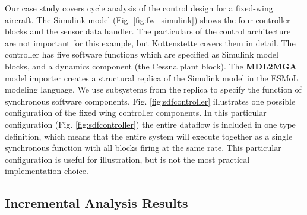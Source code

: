 Our case study covers cycle analysis of the control design for a fixed-wing 
aircraft.  The Simulink model (Fig. \ref{fig:fw_simulink}) shows the four controller blocks and the sensor data handler.  The particulars of the control architecture are not important for this example, but Kottenstette covers them in detail\cite{control:fixed_wing}.   The controller has five software functions which are specified as Simulink model blocks, and a dynamics component (the Cessna plant block).  The 
\textbf{MDL2MGA} model importer creates a structural replica of the Simulink
model in the ESMoL modeling language.  We use subsystems from the replica
to specify the function of synchronous software components.  
Fig. \ref{fig:sdfcontroller} illustrates one possible configuration of the fixed wing controller components.  
In this particular configuration 
(Fig. \ref{fig:sdfcontroller}) the entire dataflow is included in one
type definition, which means that the entire system will execute together
as a single synchronous function with all blocks firing at the same rate.
This particular configuration is useful for illustration, but is not the most practical implementation choice.  


\subsection{Incremental Analysis Results}

